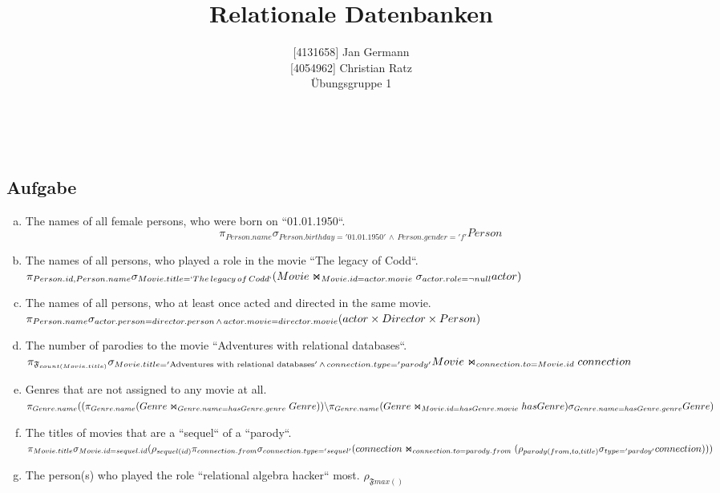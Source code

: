 \documentclass[11pt,a4paper,DIV=9]{scrartcl}
\author{{[}4131658{]} Jan Germann \\{[}4054962{]} Christian Ratz\\Übungsgruppe 1}
\title{Relationale Datenbanken}
\newcounter{temp}
\newcommand{\aufgabe}[1]{
  \setcounter{temp}{\value{subsection}}
  \setcounter{subsection}{#1}
  \addtocounter{subsection}{-1}
  \subsection{Aufgabe}
  \setcounter{subsection}{\value{temp}}
}
\renewcommand{\author}[1]{\renewcommand{\author}{#1}}
\renewcommand{\title}[1]{\renewcommand{\title}{#1}}
\newcommand{\makehomeworktitle}{
  \begin{minipage}[t]{6.5cm}
    \sf{\author}
  \end{minipage}
  \begin{minipage}[t]{6.5cm}
    \begin{flushright}
      \sf{\title\\\today}
    \end{flushright}
  \end{minipage}
  \\[0.2cm]
  \begin{center}
    \sf{
      \color{blue}{
        \LARGE{Aufgabenblatt \blattnr}
      }
    }
  \end{center}
  \vspace{0.1cm}
}
\begin{document}
\makehomeworktitle
\aufgabe{1}
  \begin{enumerate}[a)]
    \item The names of all female persons, who were born on ``01.01.1950``.
      \[ \pi_{Person.name} \sigma_{Person.birthday = '01.01.1950'\,\wedge\,Person.gender = 'f'}Person \]
    \item The names of all persons, who played a role in the movie ``The legacy of Codd``. \hfill\\
      $ \pi _{Person.id, Person.name}\\
        \sigma _{Movie.title=`{The\, legacy\, of\, Codd`}}\\
        (Movie\Join_{Movie.id = actor.movie} \sigma _{actor.role = \neg null} actor)
      $
    \item The names of all persons, who at least once acted and directed in the same movie.\hfill\\
      $
      \pi _{Person.name}\\
      \sigma _{actor.person = director.person \,\wedge\, actor.movie = director.movie}\\
      (actor \times Director \times Person)
      $
    \item The number of parodies to the movie ``Adventures with relational databases``.
      $ \pi_{\mathfrak{F}_{count(Movie.title)}} \\
      \sigma_{Movie.title = '\textrm{Adventures with relational databases}' \,\wedge\, connection.type = 'parody'}\\ Movie\Join_{connection.to = Movie.id}connection $

    \item Genres that are not assigned to any movie at all. \hfill \\
      $
        \pi _{Genre.name} \\
          ((\pi _{Genre.name}\\
          (Genre \Join _{Genre.name = hasGenre.genre} Genre ))\\
          \backslash \pi _{Genre.name} (Genre \Join _{Movie.id = hasGenre.movie} hasGenre)\\
          \sigma _{Genre.name = hasGenre.genre} Genre)
      $
    \item The titles of movies that are a ``sequel`` of a ``parody``. \\
      $\pi_{Movie.title} \\
      \sigma_{Movie.id = sequel.id} \\
      (\rho_{sequel(id)}\\
      \pi_{connection.from}\sigma_{connection.type='sequel'}\\
      (connection \Join_{connection.to = parody.from} \\ 
        (\rho_{parody(from,to,title)}\sigma_{type='pardoy'}connection)\\
      )\\
      )$
    \item The person(s) who played the role ``relational algebra hacker`` most.
      $
      \rho_{\mathfrak{F}max()}
      $
  \end{enumerate}
\end{document}
